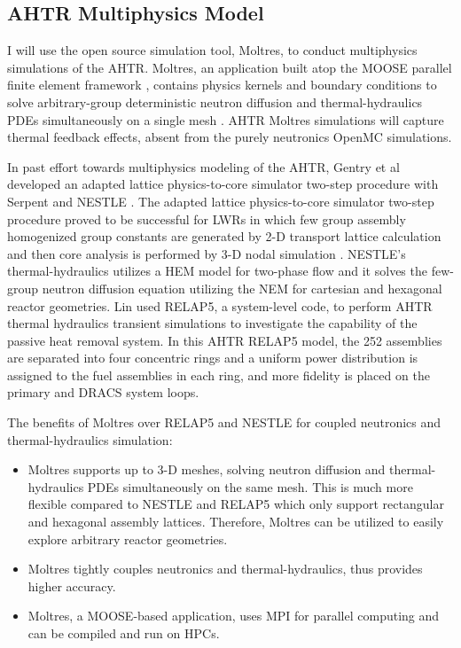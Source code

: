 \subsection{\gls{AHTR} Multiphysics Model}
I will use the open source simulation tool, Moltres, to conduct multiphysics 
simulations of the \gls{AHTR}. 
Moltres, an application built atop the \gls{MOOSE} parallel finite element 
framework \cite{gaston_moose:_2009}, contains physics kernels and boundary 
conditions to solve arbitrary-group deterministic neutron diffusion and 
thermal-hydraulics \glspl{PDE} simultaneously on a single mesh
\cite{lindsay_introduction_2018,park_advancement_2020}. 
\gls{AHTR} Moltres simulations will capture thermal feedback effects, absent
from the purely neutronics OpenMC simulations.  

In past effort towards multiphysics modeling of the \gls{AHTR}, Gentry et al 
\cite{gentry_development_2016} developed an adapted lattice physics-to-core 
simulator two-step procedure with Serpent \cite{leppanen_serpent_2014} 
and \gls{NESTLE} \cite{turinsky_nestle_1994}. 
The adapted lattice physics-to-core simulator two-step procedure proved to be 
successful for \glspl{LWR} in which few group assembly homogenized group 
constants are generated by 2-D transport lattice calculation and then core 
analysis is performed by 3-D nodal simulation 
\cite{koebke_new_1980,gentry_development_2016}. 
\gls{NESTLE}'s thermal-hydraulics utilizes a \gls{HEM} model for two-phase 
flow and it solves the few-group neutron diffusion equation utilizing the
\gls{NEM} for cartesian and hexagonal reactor geometries.  
Lin \cite{lin_thermal_2020} used RELAP5, a system-level code, to perform 
\gls{AHTR} thermal hydraulics transient simulations to investigate the 
capability of the passive heat removal system. 
In this \gls{AHTR} RELAP5 model, the 252 assemblies are separated into four 
concentric rings and a uniform power distribution is assigned to the fuel 
assemblies in each ring, and more fidelity is placed on the primary and 
\gls{DRACS} system loops. 

The benefits of Moltres over RELAP5 and NESTLE for coupled neutronics and 
thermal-hydraulics simulation: 
\begin{itemize}
  \item Moltres supports up to 3-D meshes, solving neutron diffusion and 
  thermal-hydraulics \glspl{PDE} simultaneously on the same mesh. This is much 
  more flexible compared to \gls{NESTLE} and RELAP5 which only support 
  rectangular and hexagonal assembly lattices. Therefore, Moltres can be utilized 
  to easily explore arbitrary reactor geometries.
  \item Moltres tightly couples neutronics and thermal-hydraulics, thus 
  provides higher accuracy. 
  \item Moltres, a \gls{MOOSE}-based application, uses MPI for parallel computing 
  and can be compiled and run on \glspl{HPC}. 
\end{itemize}

